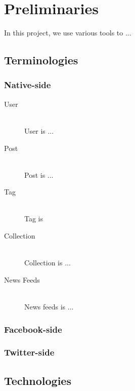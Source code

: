 
%
%

\chapter{Preliminaries}
In this project, we use various tools to ...
\section{Terminologies}
\subsection{Native-side}
\begin{description}
	\item[User] \hfill \\
	User is ...
	\item[Post] \hfill \\
	Post is ...
	\item[Tag] \hfill \\
	Tag is
	\item[Collection] \hfill \\
	Collection is ...
	\item[News Feeds] \hfill \\
	News feeds is ...
\end{description}
\subsection{Facebook-side}

\subsection{Twitter-side}

\section{Technologies}



